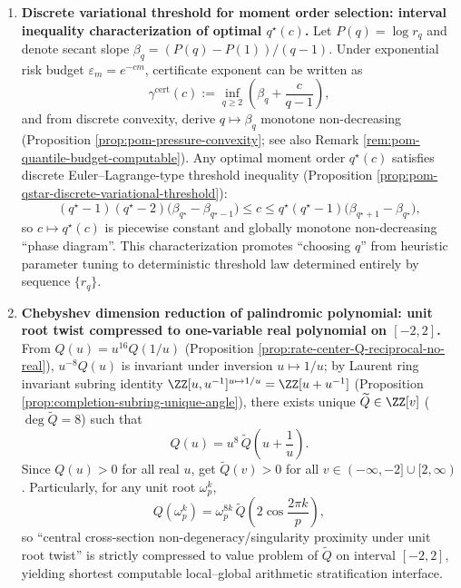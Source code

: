 \begin{enumerate}
  \item \textbf{Discrete variational threshold for moment order selection: interval inequality characterization of optimal \texorpdfstring{$q^\star(c)$}{q*(c)}.}
  Let \(P(q)=\log r_q\) and denote secant slope \(\beta_q=(P(q)-P(1))/(q-1)\).
  Under exponential risk budget \(\varepsilon_m=e^{-cm}\), certificate exponent can be written as
  \[
  \gamma^{\mathrm{cert}}(c):=\inf_{q\ge 2}\left(\beta_q+\frac{c}{q-1}\right),
  \]
  and from discrete convexity, derive \(q\mapsto\beta_q\) monotone non-decreasing (Proposition \ref{prop:pom-pressure-convexity}; see also Remark \ref{rem:pom-quantile-budget-computable}).
  Any optimal moment order \(q^\star(c)\) satisfies discrete Euler--Lagrange-type threshold inequality (Proposition \ref{prop:pom-qstar-discrete-variational-threshold}):
  \[
  (q^\star-1)(q^\star-2)\bigl(\beta_{q^\star}-\beta_{q^\star-1}\bigr)\le c\le q^\star(q^\star-1)\bigl(\beta_{q^\star+1}-\beta_{q^\star}\bigr),
  \]
  so \(c\mapsto q^\star(c)\) is piecewise constant and globally monotone non-decreasing ``phase diagram''. This characterization promotes ``choosing \(q\)'' from heuristic parameter tuning to deterministic threshold law determined entirely by sequence \(\{r_q\}\).

  \item \textbf{Chebyshev dimension reduction of palindromic polynomial: unit root twist compressed to one-variable real polynomial on \texorpdfstring{$[-2,2]$}{[-2,2]}.}
  From \(Q(u)=u^{16}Q(1/u)\) (Proposition \ref{prop:rate-center-Q-reciprocal-no-real}), \(u^{-8}Q(u)\) is invariant under inversion \(u\mapsto 1/u\); by Laurent ring invariant subring identity \(\ZZ[u,u^{-1}]^{u\mapsto 1/u}=\ZZ[u+u^{-1}]\) (Proposition \ref{prop:completion-subring-unique-angle}), there exists unique \(\widetilde Q\in\ZZ[v]\) (\(\deg\widetilde Q=8\)) such that
  \[
  Q(u)=u^8\,\widetilde Q\!\left(u+\frac1u\right).
  \]
  Since \(Q(u)>0\) for all real \(u\), get \(\widetilde Q(v)>0\) for all \(v\in(-\infty,-2]\cup[2,\infty)\).
  Particularly, for any unit root \(\omega_p^k\),
  \[
  Q(\omega_p^k)=\omega_p^{8k}\,\widetilde Q\!\left(2\cos\frac{2\pi k}{p}\right),
  \]
  so ``central cross-section non-degeneracy/singularity proximity under unit root twist'' is strictly compressed to value problem of \(\widetilde Q\) on interval \([-2,2]\), yielding shortest computable local--global arithmetic stratification interface.


\end{enumerate}
